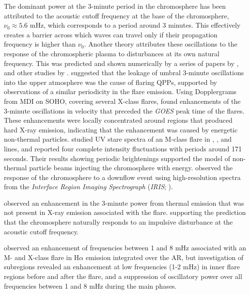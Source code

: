 %
The dominant power at the 3-minute period in the chromosphere
has been attributed to
the acoustic cutoff frequency at the base of the chromosphere,
$\nu_{0} \approx 5.6$ mHz,
which corresponds to a period around 3 minutes.
This effectively creates a barrier across which waves can travel
only if their propagation frequency is higher than $\nu_{0}$.
Another theory attributes these oscillations to the response of
the chromospheric plasma to disturbances
at its own natural frequency.
This was predicted and shown numerically by
a series of papers by \cite{Sutmann1995a,Sutmann1995b,Sutmann1998},
and other studies by \cite{Chae2015}.
\cite{Sych2009} suggested that the leakage of umbral 3-minute oscillations
into the upper atmosphere was the cause of flaring QPPs, supported by
observations of a similar periodicity in the flare emission.
Using Dopplergrams from MDI on SOHO,
covering several X-class flares,
\cite{Kumar2006}
found enhancements of the 3-minute oscillations in velocity
that preceded the \textit{GOES} peak time of the flares.
These enhancements were locally concentrated around regions that
produced hard X-ray emission, indicating
that the enhancement was caused by energetic non-thermal particles.
\cite{Brosius2015} studied UV stare spectra of an M-class flare
in , , and  lines,
and reported four complete intensity fluctuations with periods
around 171 seconds.
Their results showing periodic brightenings supported the
model of non-thermal particle beams injecting the chromosphere
with energy.
\cite{Kwak2016} observed
the response of the chromosphere to a downflow event
using high-resolution spectra from the
\textit{Interface Region Imaging Spectrograph}
(\textit{IRIS}; \cite{DePontieu2014}).

\cite{Milligan2017}
observed an enhancement in the 3-minute power from thermal emission
that was not present in X-ray emission associated with the flare.
supporting the prediction that the chromosphere naturally responds
to an impulsive disturbance at the acoustic cutoff frequency.

\cite{Monsue2016} observed
an enhancement of frequencies
between 1 and 8 mHz
associated with an M- and X-class flare
in H$\alpha$ emission integrated over the AR,
but investigation of subregions revealed an
enhancement at low frequencies (1-2 mHz) in inner flare regions
before and after the flare, and a
suppression of oscillatory power over all frequencies
between 1 and 8 mHz during the main phases.

